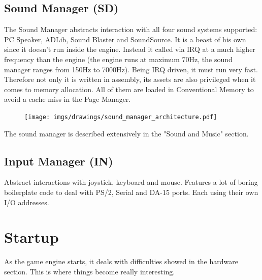 \documentclass[book.tex]{subfiles}
\begin{document}
\subsection{Sound Manager (SD)}
The Sound Manager abstracts interaction with all four sound systems supported: PC Speaker, ADLib, Sound Blaster and SoundSource. It is a beast of his own since it doesn't run inside the engine. Instead it called via IRQ at a much higher frequency than the engine (the engine runs at maximum 70Hz, the sound manager ranges from 150Hz to 7000Hz). Being IRQ driven, it must run very fast. Therefore not only it is written in assembly, its assets are also privileged when it comes to memory allocation. All of them are loaded in Conventional Memory to avoid a cache miss in the Page Manager.\\
 \par
\begin{figure}[H]
\centering
 \texttt{[image: imgs/drawings/sound\_manager\_architecture.pdf]}
 \end{figure}
 \par
The sound manager is described extensively in the "Sound and Music" section.

















\subsection{Input Manager (IN)}
Abstract interactions with joystick, keyboard and mouse. Features a lot of boring boilerplate code to deal with PS/2, Serial and DA-15 ports. Each using their own I/O addresses.
















\section{Startup}
As the game engine starts, it deals with difficulties showed in the hardware section. This is where things become really interesting.
\end{document}
